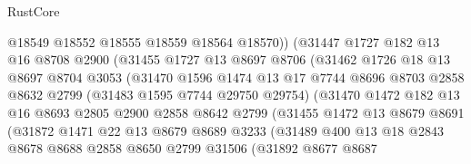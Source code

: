 \begin{lexlean}{RustCore}
\begin{coremodule}
                        @18549
                        @18552
                        @18555
                        @18559
                        @18564
                        @18570))
                    (@31447
                      @1727
                      @182
                      @13
                      @16
                      @8708
                      @2900
                      (@31455
                        @1727
                        @13
                        @8697
                        @8706
                        (@31462
                          @1726
                          @18
                          @13
                          @8697
                          @8704
                          @3053
                          (@31470
                            @1596
                            @1474
                            @13
                            @17
                            @7744
                            @8696
                            @8703
                            @2858
                            @8632
                            @2799
                            (@31483 @1595 @7744 @29750 @29754)
                            (@31470
                              @1472
                              @182
                              @13
                              @16
                              @8693
                              @2805
                              @2900
                              @2858
                              @8642
                              @2799
                              (@31455
                                @1472
                                @13
                                @8679
                                @8691
                                (@31872
                                  @1471
                                  @22
                                  @13
                                  @8679
                                  @8689
                                  @3233
                                  (@31489
                                    @400
                                    @13
                                    @18
                                    @2843
                                    @8678
                                    @8688
                                    @2858
                                    @8650
                                    @2799
                                    @31506
                                    (@31892
                                      @8677
                                      @8687

\end{coremodule}
\end{lexlean}
